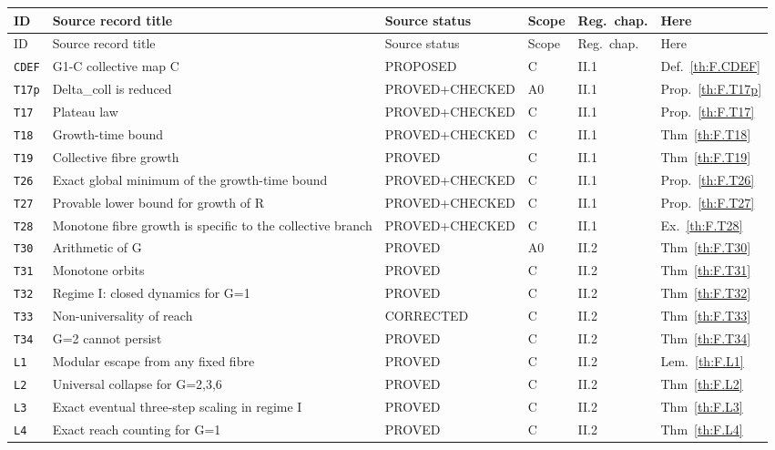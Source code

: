\footnotesize
\begin{longtable}{@{}p{13mm}p{45mm}p{33mm}p{8mm}p{12mm}p{17mm}@{}}
\toprule ID & Source record title & Source status & Scope & Reg.\ chap. & Here\\\midrule\endfirsthead
\toprule ID & Source record title & Source status & Scope & Reg.\ chap. & Here\\\midrule\endhead
\texttt{CDEF} & G1-C collective map C & PROPOSED & C & II.1 & Def.~\ref{th:F.CDEF} \\
\texttt{T17p} & Delta\_coll is reduced & PROVED+CHECKED & A0 & II.1 & Prop.~\ref{th:F.T17p} \\
\texttt{T17} & Plateau law & PROVED+CHECKED & C & II.1 & Prop.~\ref{th:F.T17} \\
\texttt{T18} & Growth-time bound & PROVED+CHECKED & C & II.1 & Thm~\ref{th:F.T18} \\
\texttt{T19} & Collective fibre growth & PROVED & C & II.1 & Thm~\ref{th:F.T19} \\
\texttt{T26} & Exact global minimum of the growth-time bound & PROVED+CHECKED & C & II.1 & Prop.~\ref{th:F.T26} \\
\texttt{T27} & Provable lower bound for growth of R & PROVED+CHECKED & C & II.1 & Prop.~\ref{th:F.T27} \\
\texttt{T28} & Monotone fibre growth is specific to the collective branch & PROVED+CHECKED & C & II.1 & Ex.~\ref{th:F.T28} \\
\texttt{T30} & Arithmetic of G & PROVED & A0 & II.2 & Thm~\ref{th:F.T30} \\
\texttt{T31} & Monotone orbits & PROVED & C & II.2 & Thm~\ref{th:F.T31} \\
\texttt{T32} & Regime I: closed dynamics for G=1 & PROVED & C & II.2 & Thm~\ref{th:F.T32} \\
\texttt{T33} & Non-universality of reach & CORRECTED & C & II.2 & Thm~\ref{th:F.T33} \\
\texttt{T34} & G=2 cannot persist & PROVED & C & II.2 & Thm~\ref{th:F.T34} \\
\texttt{L1} & Modular escape from any fixed fibre & PROVED & C & II.2 & Lem.~\ref{th:F.L1} \\
\texttt{L2} & Universal collapse for G=2,3,6 & PROVED & C & II.2 & Thm~\ref{th:F.L2} \\
\texttt{L3} & Exact eventual three-step scaling in regime I & PROVED & C & II.2 & Thm~\ref{th:F.L3} \\
\texttt{L4} & Exact reach counting for G=1 & PROVED & C & II.2 & Thm~\ref{th:F.L4} \\

\end{longtable}

